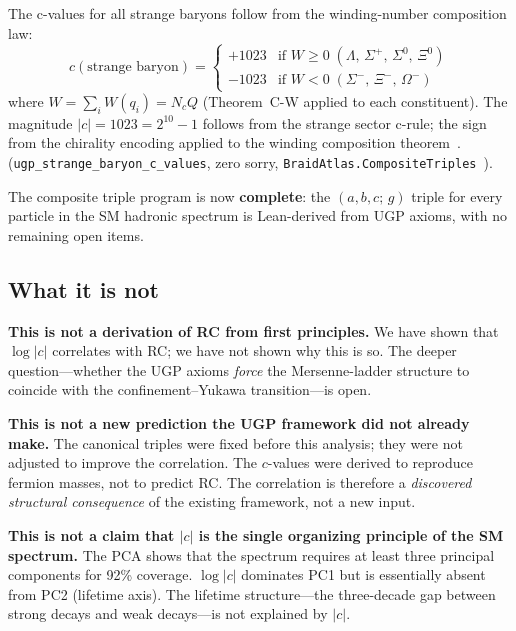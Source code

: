 \documentclass[12pt,a4paper]{article}
\begin{document}
The c-values for all strange baryons follow from the winding-number
composition law:
\[
  c(\text{strange baryon}) = \begin{cases}
    +1023 & \text{if } W \geq 0 \;(\Lambda,\,\Sigma^+,\,\Sigma^0,\,\Xi^0) \\
    -1023 & \text{if } W < 0 \;(\Sigma^-,\,\Xi^-,\,\Omega^-)
  \end{cases}
\]
where $W = \sum_i W(q_i) = N_c Q$ (Theorem~C-W applied to each constituent).
The magnitude $|c| = 1023 = 2^{10}-1$ follows from the strange sector c-rule;
the sign from the chirality
encoding applied to the winding composition theorem~\cite{SpivackBraidAtlas}.
(\texttt{ugp\_strange\_baryon\_c\_values}, zero sorry,
\texttt{BraidAtlas.CompositeTriples}~\cite{ugp-lean}).

The composite triple program is now \textbf{complete}: the $(a,b,c;\,g)$ triple for every
particle in the SM hadronic spectrum is Lean-derived from UGP axioms,
with no remaining open items.

\subsection{What it is not}

\textbf{This is not a derivation of RC from first principles.}
We have shown that $\log|c|$ correlates with RC; we have not shown
why this is so.
The deeper question---whether the UGP axioms \emph{force} the Mersenne-ladder
structure to coincide with the confinement--Yukawa transition---is open.

\textbf{This is not a new prediction the UGP framework did not already make.}
The canonical triples were fixed before this analysis; they were not adjusted
to improve the correlation.
The $c$-values were derived to reproduce fermion masses, not to predict RC.
The correlation is therefore a \emph{discovered structural consequence} of
the existing framework, not a new input.

\textbf{This is not a claim that $|c|$ is the single organizing principle
of the SM spectrum.}
The PCA shows that the spectrum requires at least three principal components
for 92\% coverage.
$\log|c|$ dominates PC1 but is essentially absent from PC2 (lifetime axis).
The lifetime structure---the three-decade gap between strong decays and
weak decays---is not explained by $|c|$.
\end{document}
